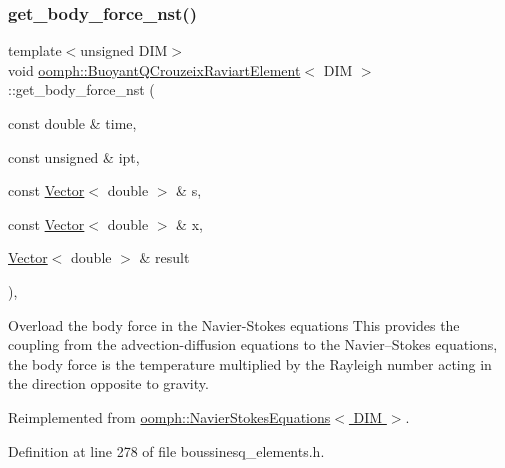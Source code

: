 \mbox{\label{classoomph_1_1BuoyantQCrouzeixRaviartElement_aeeef7868070fd692b33e5afa811af1da}} 
\subsubsection{\texorpdfstring{get\+\_\+body\+\_\+force\+\_\+nst()}{get\_body\_force\_nst()}}
{\footnotesize\ttfamily template$<$unsigned D\+IM$>$ \\
void \hyperlink{classoomph_1_1BuoyantQCrouzeixRaviartElement}{oomph\+::\+Buoyant\+Q\+Crouzeix\+Raviart\+Element}$<$ D\+IM $>$\+::get\+\_\+body\+\_\+force\+\_\+nst (\begin{DoxyParamCaption}\item[{const double \&}]{time,  }\item[{const unsigned \&}]{ipt,  }\item[{const \hyperlink{classoomph_1_1Vector}{Vector}$<$ double $>$ \&}]{s,  }\item[{const \hyperlink{classoomph_1_1Vector}{Vector}$<$ double $>$ \&}]{x,  }\item[{\hyperlink{classoomph_1_1Vector}{Vector}$<$ double $>$ \&}]{result }\end{DoxyParamCaption})\hspace{0.3cm}{\ttfamily [inline]}, {\ttfamily [virtual]}}



Overload the body force in the Navier-\/\+Stokes equations This provides the coupling from the advection-\/diffusion equations to the Navier--Stokes equations, the body force is the temperature multiplied by the Rayleigh number acting in the direction opposite to gravity. 



Reimplemented from \hyperlink{classoomph_1_1NavierStokesEquations_a8a3f44daab0e804f2d9b03ab9a962440}{oomph\+::\+Navier\+Stokes\+Equations$<$ D\+I\+M $>$}.



Definition at line 278 of file boussinesq\+\_\+elements.\+h.



